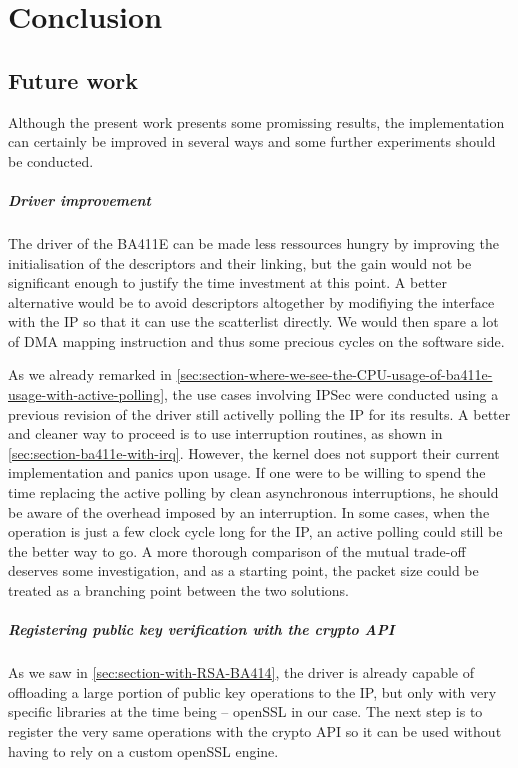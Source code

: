 \chapter{Conclusion}

\section{Future work}

Although the present work presents some promissing results, the implementation can certainly be improved in several ways and some further experiments should be conducted.

\paragraph{Driver improvement}
The driver of the BA411E can be made less ressources hungry by improving the initialisation of the descriptors and their linking, but the gain would not be significant enough to justify the time investment at this point.
A better alternative would be to avoid descriptors altogether by modifiying the interface with the IP so that it can use the scatterlist directly.
We would then spare a lot of DMA mapping instruction and thus some precious cycles on the software side.

As we already remarked in \ref{sec:section-where-we-see-the-CPU-usage-of-ba411e-usage-with-active-polling}, the use cases involving IPSec were conducted using a previous revision of the driver still activelly polling the IP for its results.
A better and cleaner way to proceed is to use interruption routines, as shown in \ref{sec:section-ba411e-with-irq}.
However, the kernel does not support their current implementation and panics upon usage.
If one were to be willing to spend the time replacing the active polling by clean asynchronous interruptions, he should be aware of the overhead imposed by an interruption.
In some cases, when the operation is just a few clock cycle long for the IP, an active polling could still be the better way to go.
A more thorough comparison of the mutual trade-off deserves some investigation, and as a starting point, the packet size could be treated as a branching point between the two solutions.


\paragraph{Registering public key verification with the crypto API}
As we saw in \ref{sec:section-with-RSA-BA414}, the driver is already capable of offloading a large portion of public key operations to the IP, but only with very specific libraries at the time being -- openSSL in our case.
The next step is to register the very same operations with the crypto API so it can be used without having to rely on a custom openSSL engine.

